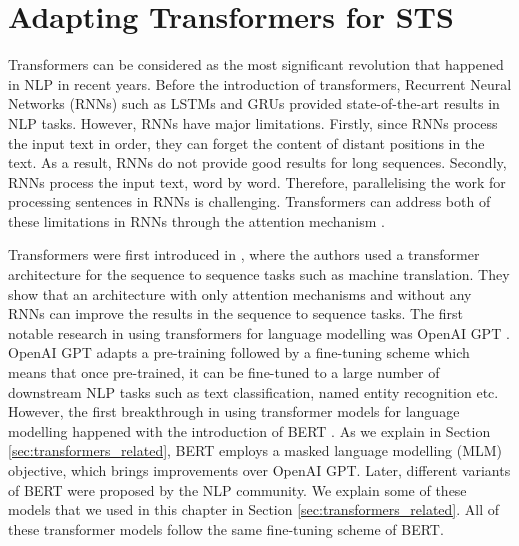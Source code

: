 \chapter{\label{cha:sts_transformers}Adapting Transformers for STS}

Transformers can be considered as the most significant revolution that happened in NLP in recent years. Before the introduction of transformers, Recurrent Neural Networks (RNNs) such as LSTMs and GRUs provided state-of-the-art results in NLP tasks. However, RNNs have major limitations. Firstly, since RNNs process the input text in order, they can forget the content of distant positions in the text. As a result, RNNs do not provide good results for long sequences. Secondly, RNNs process the input text, word by word. Therefore, parallelising the work for processing sentences in RNNs is challenging. Transformers can address both of these limitations in RNNs through the attention mechanism \autocite{NIPS2017_3f5ee243}.   


Transformers were first introduced in \textcite{NIPS2017_3f5ee243}, where the authors used a transformer architecture for the sequence to sequence tasks such as machine translation. They show that an architecture with only attention mechanisms and without any RNNs can improve the results in the sequence to sequence tasks. The first notable research in using transformers for language modelling was OpenAI GPT \autocite{radford2018improving}. OpenAI GPT adapts a pre-training followed by a fine-tuning scheme which means that once pre-trained, it can be fine-tuned to a large number of downstream NLP tasks such as text classification, named entity recognition etc. However, the first breakthrough in using transformer models for language modelling happened with the introduction of BERT \autocite{devlin-etal-2019-bert}. As we explain in Section \ref{sec:transformers_related}, BERT employs a masked language modelling (MLM) objective, which brings improvements over OpenAI GPT. Later, different variants of BERT were proposed by the NLP community. We explain some of these models that we used in this chapter in Section \ref{sec:transformers_related}. All of these transformer models follow the same fine-tuning scheme of BERT.



